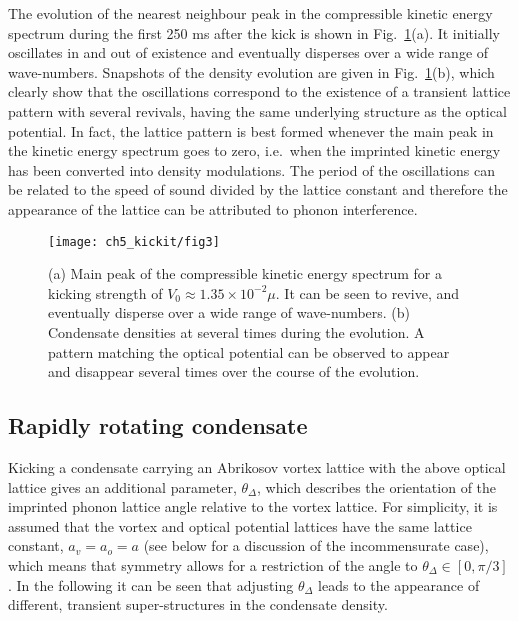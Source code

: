 The evolution of the nearest neighbour peak in the compressible kinetic energy spectrum during the first 250 ms after the kick is shown in Fig.~\ref{fig:novtx_p5k}(a). It initially oscillates in and out of existence and eventually disperses over a wide range of wave-numbers. Snapshots of the density evolution are given in Fig.~\ref{fig:novtx_p5k}(b), which clearly show that the oscillations correspond to the existence of a transient lattice pattern with several revivals, having the same underlying structure as the optical potential. In fact, the lattice pattern is best formed whenever the main peak in the kinetic energy spectrum goes to zero, i.e.~when the imprinted kinetic energy has been converted into density modulations. The period of the oscillations can be related to the speed of sound divided by the lattice constant and therefore the appearance of the lattice can be attributed to phonon interference.

\begin{figure}
    \centering

	\texttt{[image: ch5\_kickit/fig3]}
	\caption[Effect of kicking on non-rotating condensate.]{(a) Main peak of the compressible kinetic energy spectrum for a kicking strength of $V_0 \approx 1.35\times10^{-2}\mu$. It can be seen to revive, and eventually disperse over a wide range of wave-numbers.  (b) Condensate densities at several times during the evolution. A pattern matching the optical potential can be observed to appear and disappear several times over the course of the evolution.}
	\label{fig:novtx_p5k}
\end{figure}


\subsection{Rapidly rotating condensate}

    Kicking a condensate carrying an Abrikosov vortex lattice with the above optical lattice gives an additional parameter, $\theta_\Delta$, which describes the orientation of the imprinted phonon lattice angle relative to the vortex lattice. For simplicity, it is assumed that the vortex and optical potential lattices have the same lattice constant, $a_v=a_o=a$ (see below for a discussion of the incommensurate case), which means that symmetry allows for a restriction of the angle to $\theta_\Delta\in[0,\pi/3]$. In the following it can be seen that adjusting $\theta_\Delta$ leads to the appearance of different, transient super-structures in the condensate density.

